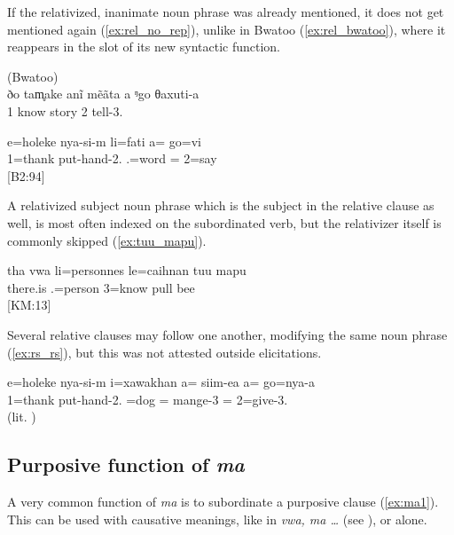 If the relativized, inanimate noun phrase was already mentioned, it does not get mentioned again (\ref{ex:rel_no_rep}), unlike in Bwatoo (\ref{ex:rel_bwatoo}), where it reappears in the slot of its new syntactic function.

\ea
\label{ex:rel_bwatoo}
 (Bwatoo)\\
\gll ðo tam̥ake anĩ mẽãta a ᵑgo θaxuti-a\\
 1 know  story  2 tell-3.\\
\glt {} \citep[71]{rivierre_bwatoo_2006}
\z

\ea\label{ex:rel_no_rep}
\gll  e=holeke nya-si-m li=fati a= go=vi\\
 1=thank put-hand-2. .=word = 2=say\\
\glt {} {[B2:94]}
\z

	
A relativized subject noun phrase which is the subject in the relative clause as well, is most often indexed on the subordinated verb, but the relativizer itself is commonly skipped (\ref{ex:tuu_mapu}).

\ea  \label{ex:tuu_mapu}
\gll tha vwa li=personnes le=caihnan tuu mapu\\
  there.is .=person 3=know pull bee\\
\glt {} {[KM:13]}
\z

Several relative clauses may follow one another, modifying the same noun phrase (\ref{ex:rs_rs}), but this was not attested outside elicitations.

\ea \label{ex:rs_rs}
\gll e=holeke nya-si-m i=xawakhan {\ob}{a}= siim-ea{\cb} {\ob}{a}= go=nya-a{\cb} \\
 1=thank put-hand-2. =dog = mange-3 = 2=give-3.\\
\glt {} (lit. )
\z

\subsection{Purposive function of \textit{ma}}
A very common function of \textit{ma} is to subordinate a purposive clause (\ref{ex:ma1}). This can be used with causative meanings, like in \textit{vwa, ma \ldots}  (see ), or alone. 

